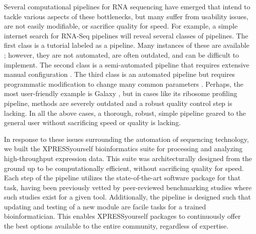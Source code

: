 \documentclass[10pt, oneside]{article}
\begin{document}
Several computational pipelines for RNA sequencing have emerged that intend to tackle various aspects of these bottlenecks, but many suffer from usability issues, are not easily modifiable, or sacrifice quality for speed. For example, a simple internet search for RNA-Seq pipelines will reveal several classes of pipelines. The first class is a tutorial labeled as a pipeline. Many instances of these are available \cite{encode_pipeline, gdc_pipeline}; however, they are not automated, are often outdated, and can be difficult to implement. The second class is a semi-automated pipeline that requires extensive manual configuration \cite{pavlidis_pipeline, nfcore_pipeline, umcu_pipeline, cellgeni_pipeline}. The third class is an automated pipeline but requires programmatic modification to change many common parameters \cite{dnanexus_pipeline, nextflow_pipeline}. Perhaps, the most user-friendly example is Galaxy \cite{galaxy}, but in cases like its ribosome profiling pipeline, methods are severely outdated and a robust quality control step is lacking. In all the above cases, a thorough, robust, simple pipeline geared to the general user without sacrificing speed or quality is lacking. \par

In response to these issues surrounding the automation of sequencing technology, we built the XPRESSyourself bioinformatics suite for processing and analyzing high-throughput expression data. This suite was architecturally designed from the ground up to be computationally efficient, without sacrificing quality for speed. Each step of the pipeline utilizes the state-of-the-art software package for that task, having been previously vetted by peer-reviewed benchmarking studies where such studies exist for a given tool. Additionally, the pipeline is designed such that updating and testing of a new module are facile tasks for a trained bioinformatician. This enables XPRESSyourself packages to continuously offer the best options available to the entire community, regardless of expertise. \par
\end{document}
